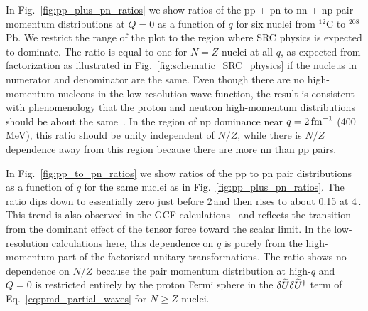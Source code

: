 \documentclass[10pt,aps,prc,floatfix,twocolumn,nofootinbib]{revtex4-1}
\begin{document}
In Fig.~\ref{fig:pp_plus_pn_ratios} we show ratios of the pp + pn to nn + np pair momentum distributions at $Q=0$ as a function of $q$ for six nuclei from $^{12}$C to $^{208}$Pb.
We restrict the range of the plot to the region where SRC physics is expected to dominate.
The ratio is equal to one for $N=Z$ nuclei at all $q$, as expected from factorization as illustrated in Fig.~\ref{fig:schematic_SRC_physics} if the nucleus in numerator and denominator are the same.
Even though there are no high-momentum nucleons in the low-resolution wave function, the result is consistent with phenomenology that the proton and neutron high-momentum distributions should be about the same~\cite{Hen:2016kwk}.
In the region of np dominance near $q=2\,\mbox{fm}^{-1}$ (400\,MeV), this ratio should be unity independent of $N/Z$, while there is $N/Z$ dependence away from this region because there are more nn than pp pairs.


In Fig.~\ref{fig:pp_to_pn_ratios} we show ratios of the pp to pn pair distributions as a function of $q$ for the same nuclei as in Fig.~\ref{fig:pp_plus_pn_ratios}.
The ratio dips down to essentially zero just before 2\,\fmi and then rises to about 0.15 at 4\,\fmi.
This trend is also observed in the GCF calculations~\cite{Cruz-Torres:2019fum,CLAS:2020rue} and reflects the transition from the dominant effect of the tensor force toward the scalar limit.
In the low-resolution calculations here, this dependence on $q$ is purely from the high-momentum part of the factorized unitary transformations.
The ratio shows no dependence on $N/Z$ because the pair momentum distribution at high-$q$ and $Q=0$ is restricted entirely by the proton Fermi sphere in the $\delta \widetilde U\delta \widetilde U^{\dagger}$ term of Eq.~\eqref{eq:pmd_partial_waves} for $N \ge Z$ nuclei.
\end{document}
